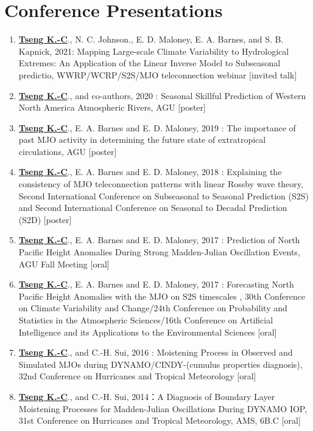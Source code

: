 \documentclass{article}
\begin{document}
\section{\color{airforceblue}Conference Presentations}
\begin{enumerate} 
	\item \normalsize{\bf{\underline{Tseng K.-C}}}., N. C. Johnson., E. D. Maloney, E. A. Barnes, and S. B. Kapnick, 2021: Mapping Large-scale Climate Variability to Hydrological Extremes: An Application of the Linear Inverse Model to Subseasonal predictio, WWRP/WCRP/S2S/​MJO teleconnection webinar [invited talk]
	\item \normalsize{\bf{\underline{Tseng K.-C}}}., and co-authors, 2020 : Seasonal Skillful Prediction of Western North America Atmospheric Rivers, AGU [poster]
	\item \normalsize{\bf{\underline{Tseng K.-C}}}., E. A. Barnes and E. D. Maloney, 2019 : The importance of past MJO activity in determining the future state of extratropical circulations, AGU [poster]
	\item \normalsize{\bf{\underline{Tseng K.-C}}}., E. A. Barnes and E. D. Maloney, 2018 : Explaining the consistency of MJO teleconnection patterns with linear Rossby wave theory, Second International Conference on Subseasonal to Seasonal Prediction (S2S) and Second International Conference on Seasonal to Decadal Prediction (S2D) [poster]
	\item \normalsize{\bf{\underline{Tseng K.-C}}}., E. A. Barnes and E. D. Maloney, 2017 : Prediction of North Pacific Height Anomalies During Strong Madden-Julian Oscillation Events, AGU Fall Meeting [oral]
	\item \normalsize{\bf{\underline{Tseng K.-C}}}., E. A. Barnes and E. D. Maloney, 2017 : Forecasting North Pacific Height Anomalies with the MJO on S2S timescales , 30th Conference on Climate Variability and Change/24th Conference on Probability and Statistics in the Atmospheric Sciences/16th Conference on Artificial Intelligence and its Applications to the Environmental Sciences [oral] 
	\item \normalsize{\bf{\underline{Tseng K.-C}}}., and C.-H. Sui, 2016 : Moistening Process in Observed and Simulated MJOs during DYNAMO/CINDY-(cumulus properties diagnosis), 32nd Conference on Hurricanes and Tropical Meteorology [oral] 
	\item \normalsize{\bf{\underline{Tseng K.-C}}}., and C.-H. Sui, 2014：A Diagnosis of Boundary Layer Moistening Processes for Madden-Julian Oscillations During DYNAMO IOP, 31st Conference on Hurricanes and Tropical Meteorology, AMS, 6B.C [oral] 
    \end{enumerate}
\end{document}
